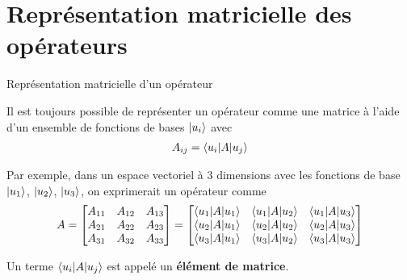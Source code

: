 \documentclass[xcolor=svgnames,t,aspectratio=169,handout]{uqtrcours}
\begin{document}
\section{Représentation matricielle des opérateurs}
\frame{\sectionpage}



\begin{frame}{Représentation matricielle d'un opérateur}

Il est toujours possible de représenter un opérateur comme une matrice
  à l'aide d'un ensemble de fonctions de bases $\ket{u_i}$ avec
\begin{align}
  A_{ij} = \braket{u_i \vert A \vert u_j}
\end{align}

Par exemple, dans un espace vectoriel à 3 dimensions
  avec les fonctions de base $\ket{u_1}$, $\ket{u_2}$, $\ket{u_3}$,
  on exprimerait un opérateur comme
\begin{align}
  A =
  \begin{bmatrix}
    A_{11} & A_{12} & A_{13} \\
    A_{21} & A_{22} & A_{23} \\
    A_{31} & A_{32} & A_{33} \\
  \end{bmatrix}
  =
  \begin{bmatrix}
    \braket{u_1 \vert A \vert u_1} & \braket{u_1 \vert A \vert u_2} & \braket{u_1 \vert A \vert u_3} \\
    \braket{u_2 \vert A \vert u_1} & \braket{u_2 \vert A \vert u_2} & \braket{u_2 \vert A \vert u_3} \\
    \braket{u_3 \vert A \vert u_1} & \braket{u_3 \vert A \vert u_2} & \braket{u_3 \vert A \vert u_3} \\
  \end{bmatrix}
\end{align}

Un terme $\braket{u_i \vert A \vert u_j}$
  est appelé un \textbf{élément de matrice}.

\end{frame}


%
%
%
%
%
%
%
%
\end{document}
